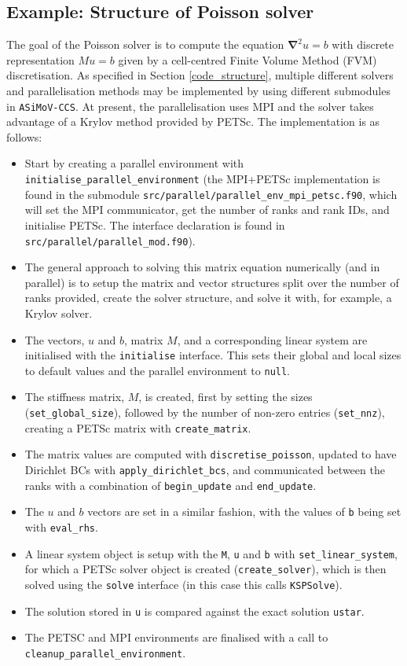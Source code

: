 \documentclass[11pt]{report}
\newcommand{\accs}{\texttt{ASiMoV-CCS}}
\begin{document}
\subsection{Example: Structure of Poisson solver}
The goal of the Poisson solver is to compute the equation ${\boldsymbol{\nabla}}^2 u = b$ with discrete representation $M u = b$ given by a cell-centred Finite Volume Method (FVM) discretisation. As specified in Section \ref{code_structure}, multiple different solvers and parallelisation methods may be implemented by using different submodules in \accs . At present, the parallelisation uses MPI and the solver takes advantage of a Krylov method provided by PETSc. The implementation is as follows:
\begin{itemize}
  \item Start by creating a parallel environment with \texttt{initialise\_parallel\_environment} (the MPI+PETSc implementation is found in the submodule \texttt{src/parallel/parallel\_env\_mpi\_petsc.f90}, which will set the MPI communicator, get the number of ranks and rank IDs, and initialise PETSc. The interface declaration is found in \texttt{src/parallel/parallel\_mod.f90}). 
  \item The general approach to solving this matrix equation numerically (and in parallel) is to setup the matrix and vector structures split over the number of ranks provided, create the solver structure, and solve it with, for example, a Krylov solver.
  \item The vectors, $u$ and $b$, matrix $M$, and a corresponding linear system are initialised with the \texttt{initialise} interface. This sets their global and local sizes to default values and the parallel environment to \texttt{null}.
  \item The stiffness matrix, $M$, is created, first by setting the sizes (\texttt{set\_global\_size}), followed by the number of non-zero entries (\texttt{set\_nnz}), creating a PETSc matrix with \texttt{create\_matrix}.
  \item The matrix values are computed with \texttt{discretise\_poisson}, updated to have Dirichlet BCs with \texttt{apply\_dirichlet\_bcs}, and communicated between the ranks with a combination of \texttt{begin\_update} and \texttt{end\_update}.
  \item The $u$ and $b$ vectors are set in a similar fashion, with the values of \texttt{b} being set with \texttt{eval\_rhs}.
  \item A linear system object is setup with the \texttt{M}, \texttt{u} and \texttt{b} with \texttt{set\_linear\_system}, for which a PETSc solver object is created (\texttt{create\_solver}), which is then solved using the \texttt{solve} interface (in this case this calls \texttt{KSPSolve}). 
  \item The solution stored in \texttt{u} is compared against the exact solution \texttt{ustar}.
  \item The PETSC and MPI environments are finalised with a call to \texttt{cleanup\_parallel\_environment}.
\end{itemize}
\end{document}
